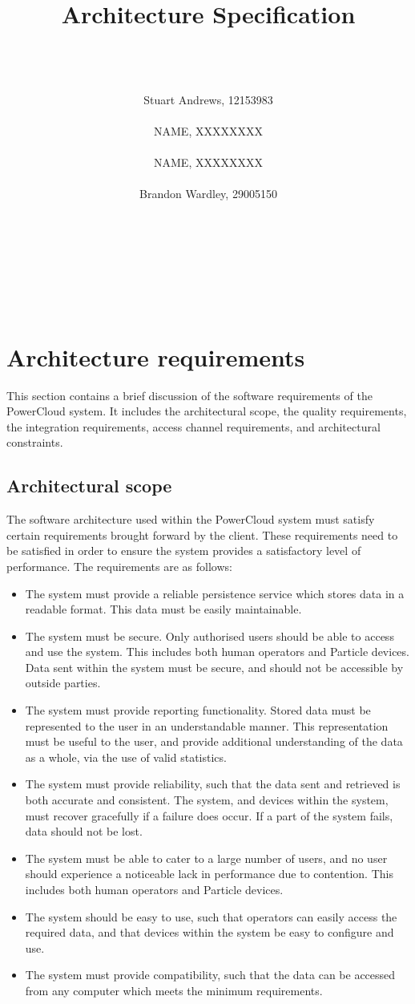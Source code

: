 \documentclass{article}
\title{Architecture Specification}
\author
{  
	\\\\\\
	Stuart Andrews, 12153983 
	\\\\
	NAME, XXXXXXXX
	\\\\
	NAME, XXXXXXXX 
	\\\\
	Brandon Wardley, 29005150 
	\\\\\\\\\\\\\\
}
\begin{document}
\maketitle
\thispagestyle{empty}
\newpage
\tableofcontents

\newpage

\section{Architecture requirements}

This section contains a brief discussion of the software requirements of the PowerCloud system. It includes the architectural scope, the quality requirements, the integration requirements, access channel requirements, and architectural constraints.

	\subsection{Architectural scope}
	
	The software architecture used within the PowerCloud system must satisfy certain requirements brought forward by the client. These requirements need to be satisfied in order to ensure the system provides a satisfactory level of performance. The requirements are as follows:

	\begin{itemize}
		\item The system must provide a reliable persistence service which stores data in a readable format. This data must be easily maintainable.
		\item The system must be secure. Only authorised users should be able to access and use the system. This includes both human operators and Particle devices. Data sent within the system must be secure, and should not be accessible by outside parties.
		\item The system must provide reporting functionality. Stored data must be represented to the user in an understandable manner. This representation must be useful to the user, and provide additional understanding of the data as a whole, via the use of valid statistics.
		\item The system must provide reliability, such that the data sent and retrieved is both accurate and consistent. The system, and devices within the system, must recover gracefully if a failure does occur. If a part of the system fails, data should not be lost.
		\item The system must be able to cater to a large number of users, and no user should experience a noticeable lack in performance due to contention. This includes both human operators and Particle devices.
		\item The system should be easy to use, such that operators can easily access the required data, and that devices within the system be easy to configure and use.
		\item The system must provide compatibility, such that the data can be accessed from any computer which meets the minimum requirements.
	\end{itemize}
	
\end{document}
